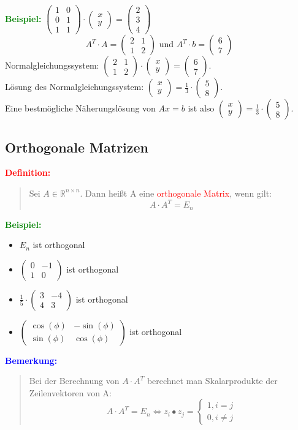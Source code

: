 \documentclass{article}
\newcommand{\red}[1]{\textcolor{red}{#1}}
\newcommand{\blue}[1]{\textcolor{blue}{#1}}
\newcommand{\green}[1]{\textcolor{green}{#1}}
\newcommand{\ex}{\green{\textbf{Beispiel: }}}
\newcommand{\de}[1]{\red{\textbf{Definition: }}\begin{quote}#1\end{quote}}
\newcommand{\an}[1]{\blue{\textbf{Bemerkung: }}\begin{quote}#1\end{quote}}
\newcommand{\R}{\mathbb{R}}
\newcommand{\vvec}[2]{\begin{pmatrix}#1\\#2\end{pmatrix}}
\newcommand{\vvvec}[3]{\begin{pmatrix}#1\\#2\\#3\end{pmatrix}}
\begin{document}
\newpage
\ex $\begin{pmatrix}
    1 & 0\\
    0 & 1\\
    1 & 1
\end{pmatrix} \cdot \vvec{x}{y} = \vvvec{2}{3}{4}$
\[
    A^T \cdot A = \begin{pmatrix}
        2 & 1\\
        1 & 2
    \end{pmatrix} \text{ und } A^T \cdot b = \vvec{6}{7}
\]
Normalgleichungssystem: $\begin{pmatrix}
    2 & 1\\
    1 & 2
\end{pmatrix} \cdot \vvec{x}{y} = \vvec{6}{7}$.\\
Lösung des Normalgleichungssystem: $\vvec{x}{y} = \frac{1}{3} \cdot \vvec{5}{8}$.\\
Eine bestmögliche Näherungslösung von $Ax = b$ ist also $\vvec{x}{y} = \frac{1}{3} \cdot \vvec{5}{8}$.

\subsection{Orthogonale Matrizen}

\de{
    Sei $A \in \R^{n \times n}$. Dann heißt A eine \red{orthogonale Matrix}, wenn gilt: $$A \cdot A^T = E_n$$
}

\ex \begin{itemize}
    \item $E_n$ ist orthogonal
    \item $\begin{pmatrix}
        0 & -1\\
        1 & 0
    \end{pmatrix}$ ist orthogonal
    \item $\frac{1}{5} \cdot \begin{pmatrix}
        3 & -4\\
        4 & 3
    \end{pmatrix}$ ist orthogonal
    \item $\begin{pmatrix}
        \cos(\phi) & -\sin(\phi)\\
        \sin(\phi) & \cos(\phi)
    \end{pmatrix}$ ist orthogonal
\end{itemize}

\an{
    Bei der Berechnung von $A \cdot A^T$ berechnet man Skalarprodukte der Zeilenvektoren von A:
    \[
        A \cdot A^T = E_n \iff z_i \bullet z_j = \begin{cases}
            1, i = j\\
            0, i \ne j
        \end{cases}
    \]
}
\end{document}
